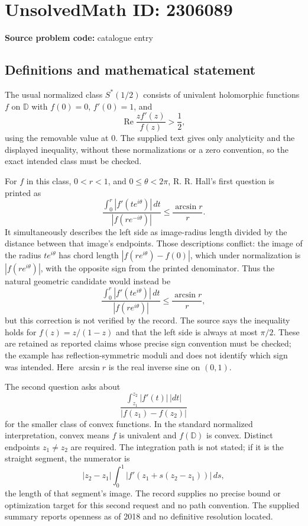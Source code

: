 \documentclass[11pt]{article}
\begin{document}
\section*{UnsolvedMath ID: 2306089}
\textbf{Source problem code:} catalogue entry
\subsection{Definitions and mathematical statement}
The usual normalized class $S^*(1/2)$ consists of univalent holomorphic functions $f$ on $\mathbb D$ with $f(0)=0$, $f'(0)=1$, and
\[
\operatorname{Re}\frac{zf'(z)}{f(z)}>\frac12,
\]
using the removable value at $0$. The supplied text gives only analyticity and the displayed inequality, without these normalizations or a zero convention, so the exact intended class must be checked.

For $f$ in this class, $0<r<1$, and $0\leq\theta<2\pi$, R. R. Hall's first question is printed as
\[
\frac{\int_0^r|f'(te^{i\theta})|\,dt}{|f(re^{-i\theta})|}
\leq\frac{\arcsin r}{r}.
\]
It simultaneously describes the left side as image-radius length divided by the distance between that image's endpoints. Those descriptions conflict: the image of the radius $te^{i\theta}$ has chord length $|f(re^{i\theta})-f(0)|$, which under normalization is $|f(re^{i\theta})|$, with the opposite sign from the printed denominator. Thus the natural geometric candidate would instead be
\[
\frac{\int_0^r|f'(te^{i\theta})|\,dt}{|f(re^{i\theta})|}
\leq\frac{\arcsin r}{r},
\]
but this correction is not verified by the record. The source says the inequality holds for $f(z)=z/(1-z)$ and that the left side is always at most $\pi/2$. These are retained as reported claims whose precise sign convention must be checked; the example has reflection-symmetric moduli and does not identify which sign was intended. Here $\arcsin r$ is the real inverse sine on $(0,1)$.

The second question asks about
\[
\frac{\int_{z_1}^{z_2}|f'(t)|\,|dt|}{|f(z_1)-f(z_2)|}
\]
for the smaller class of convex functions. In the standard normalized interpretation, convex means $f$ is univalent and $f(\mathbb D)$ is convex. Distinct endpoints $z_1\ne z_2$ are required. The integration path is not stated; if it is the straight segment, the numerator is
\[
|z_2-z_1|\int_0^1|f'(z_1+s(z_2-z_1))|\,ds,
\]
the length of that segment's image. The record supplies no precise bound or optimization target for this second request and no path convention. The supplied summary reports openness as of 2018 and no definitive resolution located.
\end{document}
